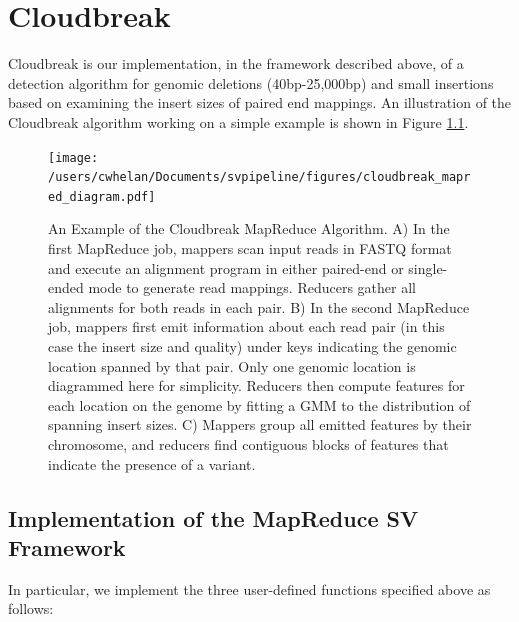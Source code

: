 \chapter{Cloudbreak}\label{chap_cloudbreak_impl}

Cloudbreak is our implementation, in the framework described above, of a detection algorithm for genomic deletions (40bp-25,000bp) and small insertions based on examining the insert sizes of paired end mappings. An illustration of the Cloudbreak algorithm working on a simple example is shown in Figure \ref{cloudbreak_example}.

\begin{figure}
\centering
\texttt{[image: /users/cwhelan/Documents/svpipeline/figures/cloudbreak\_mapred\_diagram.pdf]}
\caption{An Example of the Cloudbreak MapReduce Algorithm. A) In the first MapReduce job, mappers scan input reads in FASTQ format and execute an alignment program in either paired-end or single-ended mode to generate read mappings. Reducers gather all alignments for both reads in each pair. B) In the second MapReduce job, mappers first emit information about each read pair (in this case the insert size and quality) under keys indicating the genomic location spanned by that pair. Only one genomic location is diagrammed here for simplicity. Reducers then compute features for each location on the genome by fitting a GMM to the distribution of spanning insert sizes. C) Mappers group all emitted features by their chromosome, and reducers find contiguous blocks of features that indicate the presence of a variant.}
\label{cloudbreak_example}
\end{figure}


\section{Implementation of the MapReduce SV Framework}

In particular, we implement the three user-defined functions specified above as follows:

